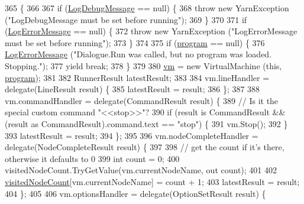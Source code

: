 \begin{DoxyCode}
365                                                                                              \{
366 
367             \textcolor{keywordflow}{if} (\hyperlink{a00090_a381f48bb0fbb294f8cf44ca57f11be31}{LogDebugMessage} == null) \{
368                 \textcolor{keywordflow}{throw} \textcolor{keyword}{new} YarnException (\textcolor{stringliteral}{"LogDebugMessage must be set before running"});
369             \}
370 
371             \textcolor{keywordflow}{if} (\hyperlink{a00090_a9801e83dd044d6498fdf6ebcc6bec5ac}{LogErrorMessage} == null) \{
372                 \textcolor{keywordflow}{throw} \textcolor{keyword}{new} YarnException (\textcolor{stringliteral}{"LogErrorMessage must be set before running"});
373             \}
374 
375             \textcolor{keywordflow}{if} (\hyperlink{a00090_a0a1cca92325f430425d784d416cb5c2b}{program} == null) \{
376                 \hyperlink{a00090_a9801e83dd044d6498fdf6ebcc6bec5ac}{LogErrorMessage} (\textcolor{stringliteral}{"Dialogue.Run was called, but no program was loaded.
       Stopping."});
377                 yield \textcolor{keywordflow}{break};
378             \}
379 
380             \hyperlink{a00090_a8c1319357a9df6cff051328fb33224c7}{vm} = \textcolor{keyword}{new} VirtualMachine (\textcolor{keyword}{this}, \hyperlink{a00090_a0a1cca92325f430425d784d416cb5c2b}{program});
381 
382             RunnerResult latestResult;
383 
384             vm.lineHandler = delegate(LineResult result) \{
385                 latestResult = result;
386             \};
387 
388             vm.commandHandler = delegate(CommandResult result) \{
389                 \textcolor{comment}{// Is it the special custom command "<<stop>>"?}
390                 \textcolor{keywordflow}{if} (result is CommandResult && (result as CommandResult).command.text == \textcolor{stringliteral}{"stop"}) \{
391                     vm.Stop();
392                 \}
393                 latestResult = result;
394             \};
395 
396             vm.nodeCompleteHandler = delegate(NodeCompleteResult result) \{
397 
398                 \textcolor{comment}{// get the count if it's there, otherwise it defaults to 0}
399                 \textcolor{keywordtype}{int} count = 0;
400                 visitedNodeCount.TryGetValue(vm.currentNodeName, out count);
401 
402                 \hyperlink{a00090_aae9e64354066a1e2fa130629959d772b}{visitedNodeCount}[vm.currentNodeName] = count + 1;
403                 latestResult = result;
404             \};
405 
406             vm.optionsHandler = delegate(OptionSetResult result) \{

\end{DoxyCode}
